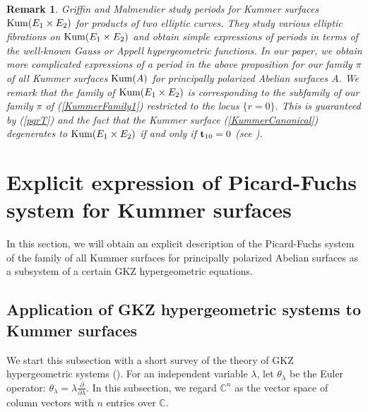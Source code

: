 \documentclass[10pt]{article}
\newtheorem{rem}{Remark}[section]
\begin{document}
\begin{rem}\label{RemGM}
Griffin and Malmendier \cite{GM} 
study periods  for Kummer surfaces ${\rm Kum}(E_1 \times E_2)$ for products of two elliptic curves.
They study various elliptic fibrations on ${\rm Kum}(E_1 \times E_2)$
and obtain simple expressions of periods in terms of  the well-known Gauss or Appell hypergeometric functions.
In our paper,
we obtain more complicated expressions of a period in the above proposition for our family $\pi$ of all Kummer surfaces ${\rm Kum}(A)$ for principally polarized Abelian surfaces $A$.
We remark that the family of ${\rm Kum}(E_1 \times E_2)$ is corresponding to the subfamily of our family $\pi$ of (\ref{KummerFamily1}) restricted to the locus $\{r=0\}$. 
This is guaranteed by (\ref{pqrT}) and the fact that the Kummer surface (\ref{KummerCanonical}) degenerates to ${\rm Kum} (E_1 \times E_2)$ if and only if ${\bf t}_{10}=0$ (see \cite{NS}).
\end{rem}




\section{Explicit expression of Picard-Fuchs system for Kummer surfaces}


In this section, we will obtain an explicit description of the Picard-Fuchs system of the family of all Kummer surfaces for principally polarized Abelian surfaces as a subsystem of a certain GKZ hypergeometric equations.




\subsection{Application of GKZ hypergeometric systems to Kummer surfaces}

We start this subsection with a short survey of the theory of GKZ hypergeometric systems (\cite{GKZ}).
For an independent variable $\lambda$,  
let $ \theta_\lambda$ be the  Euler operator: $ \theta_\lambda=\lambda \frac{\partial}{\partial \lambda} $.
In this subsection, we regard $\mathbb{C}^n $ as the vector space of column vectors with $n$ entries over $\mathbb{C}$.
\end{document}
